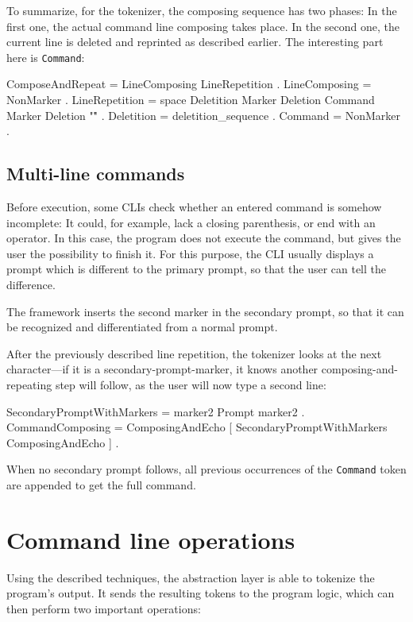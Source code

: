 \documentclass[paper=a4,twoside,abstract=on,cleardoublepage=empty,numbers=noenddot,toc=bib,toc=listof,12pt,appendixprefix=true]{scrreprt}
\begin{document}
To summarize, for the tokenizer, the composing sequence has two phases: In the first one, the actual command line composing takes place. In the second one, the current line is deleted and reprinted as described earlier. The interesting part here is \texttt{Command}:

\begin{ebnf}
ComposeAndRepeat = LineComposing LineRepetition .
LineComposing = { NonMarker } .
LineRepetition = space Deletition Marker Deletion Command
    Marker Deletion "\r" .
Deletition = { deletition_sequence } .
Command = { NonMarker } .
\end{ebnf}

\subsection*{Multi-line commands}

Before execution, some \textsc{CLI}s check whether an entered command is somehow incomplete: It could, for example, lack a closing parenthesis, or end with an operator. In this case, the program does not execute the command, but gives the user the possibility to finish it. For this purpose, the \textsc{CLI} usually displays a prompt which is different to the primary prompt, so that the user can tell the difference.

The framework inserts the second marker in the secondary prompt, so that it can be recognized and differentiated from a normal prompt.

After the previously described line repetition, the tokenizer looks at the next character---if it is a secondary-prompt-marker, it knows another composing-and-repeating step will follow, as the user will now type a second line:

\begin{ebnf}
SecondaryPromptWithMarkers = marker2 Prompt marker2 .
CommandComposing = ComposingAndEcho
    [ { SecondaryPromptWithMarkers ComposingAndEcho } ] .
\end{ebnf}
%
When no secondary prompt follows, all previous occurrences of the \texttt{Command} token are appended to get the full command.

\section{Command line operations}

Using the described techniques, the abstraction layer is able to tokenize the program's output. It sends the resulting tokens to the program logic, which can then perform two important operations:
\end{document}
